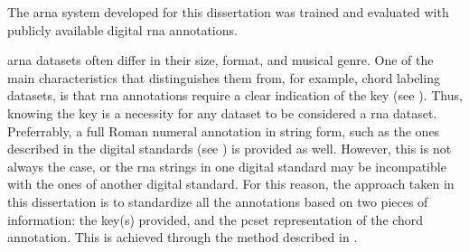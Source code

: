 
The \gls{arna} system developed for this dissertation was
trained and evaluated with publicly available digital
\gls{rna} annotations. 

\gls{arna} datasets often  differ in their size, format, and
musical genre. One of the main characteristics that
distinguishes them from, for example, chord labeling
datasets, is that \gls{rna} annotations require a clear
indication of the key (see ). Thus,
knowing the key is a necessity for any dataset to be
considered a \gls{rna} dataset. Preferrably, a full Roman
numeral annotation in string form, such as the ones
described in the digital standards (see
) is provided as well.
However, this is not always the case, or the \gls{rna}
strings in one digital standard may be incompatible with the
ones of another digital standard. For this reason, the
approach taken in this dissertation is to standardize all
the annotations based on two pieces of information: the
key(s) provided, and the \gls{pcset} representation of the
chord annotation. This is achieved through the method
described in
.


